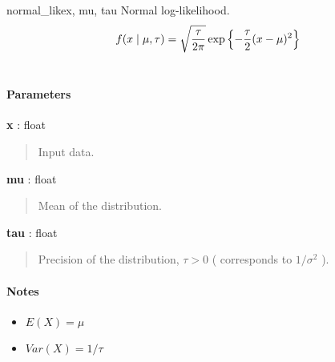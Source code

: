 \hypertarget{pymc.distributions.normal_like}{}
\begin{funcdesc}{normal\_like}{x, mu, tau}
Normal log-likelihood.
\begin{gather}
\begin{split}f(x \mid \mu, \tau) = \sqrt{\frac{\tau}{2\pi}} \exp\left\{ -\frac{\tau}{2} (x-\mu)^2 \right\}\end{split}\notag\\\begin{split}\end{split}\notag
\end{gather}\paragraph{Parameters}\begin{paramlist}

\item[] \textbf{x} : float
\begin{quote}

Input data.
\end{quote}

\item[] \textbf{mu} : float
\begin{quote}

Mean of the distribution.
\end{quote}

\item[] \textbf{tau} : float
\begin{quote}

Precision of the distribution, $\tau>0$ ( corresponds to $1/\sigma^2$ ).
\end{quote}
\end{paramlist}
\paragraph{Notes}
\begin{itemize}
\item {} 
$E(X) = \mu$

\item {} 
$Var(X) = 1/\tau$

\end{itemize}
\end{funcdesc}

